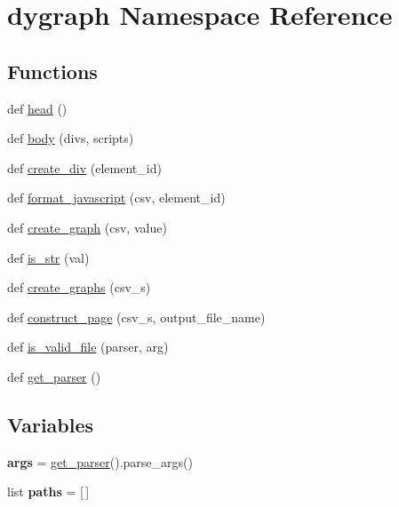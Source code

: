 \hypertarget{namespacedygraph}{}\section{dygraph Namespace Reference}
\label{namespacedygraph}
\subsection*{Functions}
\begin{DoxyCompactItemize}
\item 
def \hyperlink{namespacedygraph_a38c909f265127c0dddf064736732fd2e}{head} ()
\item 
def \hyperlink{namespacedygraph_aa1c1ef22e533672d93bf86b233a5654f}{body} (divs, scripts)
\item 
def \hyperlink{namespacedygraph_a709fc2a220af310c7d345774b1bcd867}{create\+\_\+div} (element\+\_\+id)
\item 
def \hyperlink{namespacedygraph_a335c78514adf717b318ea79cf51f2a77}{format\+\_\+javascript} (csv, element\+\_\+id)
\item 
def \hyperlink{namespacedygraph_ac1ba86fde42a8f787d8bca68ce8100f2}{create\+\_\+graph} (csv, value)
\item 
def \hyperlink{namespacedygraph_aa653f1d1753e6108461061f8e1b90d40}{is\+\_\+str} (val)
\item 
def \hyperlink{namespacedygraph_a2c174130d53d0774861cdd8270c59fec}{create\+\_\+graphs} (csv\+\_\+s)
\item 
def \hyperlink{namespacedygraph_a57fa7c9ff52b13cd6bfea53bcaf8762a}{construct\+\_\+page} (csv\+\_\+s, output\+\_\+file\+\_\+name)
\item 
def \hyperlink{namespacedygraph_a02c45467b80e5d1de197a2c99ad33ef9}{is\+\_\+valid\+\_\+file} (parser, arg)
\item 
def \hyperlink{namespacedygraph_a80a524f2253d01dd79ca6ab3c5dcae23}{get\+\_\+parser} ()
\end{DoxyCompactItemize}
\subsection*{Variables}
\begin{DoxyCompactItemize}
\item 
{\bfseries args} = \hyperlink{namespacedygraph_a80a524f2253d01dd79ca6ab3c5dcae23}{get\+\_\+parser}().parse\+\_\+args()\hypertarget{namespacedygraph_a12c05b493e6a77d18ee93bda0419a800}{}\label{namespacedygraph_a12c05b493e6a77d18ee93bda0419a800}

\item 
list {\bfseries paths} = \mbox{[}$\,$\mbox{]}\hypertarget{namespacedygraph_ab34bdf0f10a9c0ed2535234a85743fdc}{}\label{namespacedygraph_ab34bdf0f10a9c0ed2535234a85743fdc}

\end{DoxyCompactItemize}


